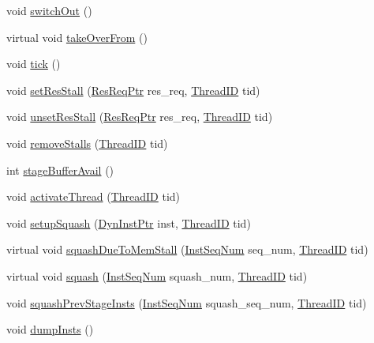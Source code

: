 \begin{DoxyCompactItemize}
\item 
void \hyperlink{classPipelineStage_a05f299b443f8cc73a93d61572edc0218}{switchOut} ()
\item 
virtual void \hyperlink{classPipelineStage_a8674059ce345e23aac5086b2c3e24a43}{takeOverFrom} ()
\item 
void \hyperlink{classPipelineStage_a873dd91783f9efb4a590aded1f70d6b0}{tick} ()
\item 
void \hyperlink{classPipelineStage_af11246f186567b60383a2ff1d4bcf27c}{setResStall} (\hyperlink{classResourceRequest}{ResReqPtr} res\_\-req, \hyperlink{base_2types_8hh_ab39b1a4f9dad884694c7a74ed69e6a6b}{ThreadID} tid)
\item 
void \hyperlink{classPipelineStage_a71090c4bc5fc055eb0ea621cb65fddc8}{unsetResStall} (\hyperlink{classResourceRequest}{ResReqPtr} res\_\-req, \hyperlink{base_2types_8hh_ab39b1a4f9dad884694c7a74ed69e6a6b}{ThreadID} tid)
\item 
void \hyperlink{classPipelineStage_af5bd22ce78c3a8bafb5b91b7b70e8a41}{removeStalls} (\hyperlink{base_2types_8hh_ab39b1a4f9dad884694c7a74ed69e6a6b}{ThreadID} tid)
\item 
int \hyperlink{classPipelineStage_a4623e7080104807616729bb5504b76ce}{stageBufferAvail} ()
\item 
void \hyperlink{classPipelineStage_a687aa4600423bb30ecf3bb1da6cd6000}{activateThread} (\hyperlink{base_2types_8hh_ab39b1a4f9dad884694c7a74ed69e6a6b}{ThreadID} tid)
\item 
void \hyperlink{classPipelineStage_a9c19142b0bc2ce7b7a6593a5190cebc7}{setupSquash} (\hyperlink{classRefCountingPtr}{DynInstPtr} inst, \hyperlink{base_2types_8hh_ab39b1a4f9dad884694c7a74ed69e6a6b}{ThreadID} tid)
\item 
virtual void \hyperlink{classPipelineStage_a960b60a46045a5363df0c263f0f43902}{squashDueToMemStall} (\hyperlink{inst__seq_8hh_a258d93d98edaedee089435c19ea2ea2e}{InstSeqNum} seq\_\-num, \hyperlink{base_2types_8hh_ab39b1a4f9dad884694c7a74ed69e6a6b}{ThreadID} tid)
\item 
virtual void \hyperlink{classPipelineStage_aee9dc23de90acd20200641407a3bd1da}{squash} (\hyperlink{inst__seq_8hh_a258d93d98edaedee089435c19ea2ea2e}{InstSeqNum} squash\_\-num, \hyperlink{base_2types_8hh_ab39b1a4f9dad884694c7a74ed69e6a6b}{ThreadID} tid)
\item 
void \hyperlink{classPipelineStage_adbce9d3c16239dca0ffd19bc176ea258}{squashPrevStageInsts} (\hyperlink{inst__seq_8hh_a258d93d98edaedee089435c19ea2ea2e}{InstSeqNum} squash\_\-seq\_\-num, \hyperlink{base_2types_8hh_ab39b1a4f9dad884694c7a74ed69e6a6b}{ThreadID} tid)
\item 
void \hyperlink{classPipelineStage_a80587b4fe043bbe1995536cb3b361588}{dumpInsts} ()
\end{DoxyCompactItemize}
